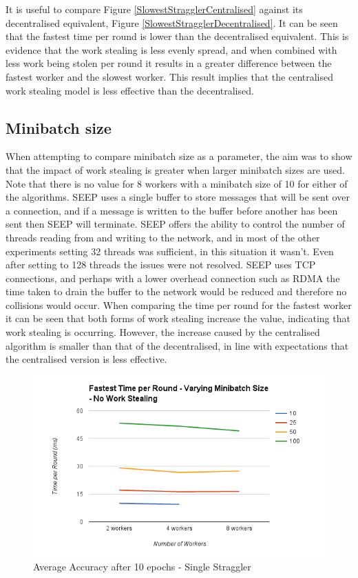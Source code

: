 \documentclass[12pt]{article}
\begin{document}
It is useful to compare Figure \ref{SlowestStragglerCentralised} against its decentralised equivalent, Figure \ref{SlowestStragglerDecentralised}. It can be seen that the fastest time per round is lower than the decentralised equivalent. This is evidence that the work stealing is less evenly spread, and when combined with less work being stolen per round it results in a greater difference between the fastest worker and the slowest worker. This result implies that the centralised work stealing model is less effective than the decentralised.

\subsection{Minibatch size}

When attempting to compare minibatch size as a parameter, the aim was to show that the impact of work stealing is greater when larger minibatch sizes are used. Note that there is no value for 8 workers with a minibatch size of 10 for either of the algorithms. SEEP uses a single buffer to store messages that will be sent over a connection, and if a message is written to the buffer before another has been sent then SEEP will terminate. SEEP offers the ability to control the number of threads reading from and writing to the network, and in most of the other experiments setting 32 threads was sufficient, in this situation it wasn't. Even after setting to 128 threads the issues were not resolved. SEEP uses TCP connections, and perhaps with a lower overhead connection such as RDMA the time taken to drain the buffer to the network would be reduced and therefore no collisions would occur.
\newline
\newline
When comparing the time per round for the fastest worker it can be seen that both forms of work stealing increase the value, indicating that work stealing is occurring. However, the increase caused by the centralised algorithm is smaller than that of the decentralised, in line with expectations that the centralised version is less effective.

\begin{figure}[H]
  \centering
  \includegraphics[width=6in]{FastestMinibatchNo}
  \caption[]{Average Accuracy after 10 epochs - Single Straggler}
  \label{FastestMinibatchNo}
\end{figure}
\end{document}

